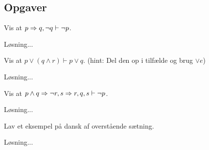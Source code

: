 \ifx\preampleIncluded\undefined
\def\startOpgaverUdsagnslogik{}


\fi

\subsection{Opgaver}
\begin{opg}
    Vis at $p \Rightarrow q, \lnot q \vdash \lnot p$.
	\begin{solution}
		Løsning...
	\end{solution}
\end{opg}

\begin{opg}
    Vis at $p \lor (q \land r) \vdash p \lor q$.
    (hint: Del den op i tilfælde og brug $\lor e$)
	\begin{solution}
		Løsning...
	\end{solution}
\end{opg}

\begin{opg}
    Vis at $p \land q \Rightarrow \lnot r, s \Rightarrow r, q, s \vdash \lnot p$.
	\begin{solution}
		Løsning...
	\end{solution}
\end{opg}

\begin{opg}
    Lav et eksempel på dansk af overstående sætning.
	\begin{solution}
		Løsning...
	\end{solution}
\end{opg}

\ifdefined\startOpgaverUdsagnslogik\fi
